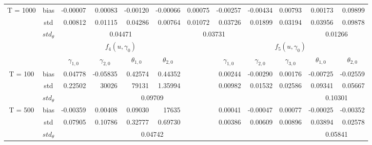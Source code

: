 \documentclass[a4paper,12pt,times,numbered,print,index]{report}
\numberwithin{equation}{section}
\begin{document}
\begin{table}[htbp]
\begin{adjustbox}{max width=1.1\textwidth}
\begin{tabular}{cc|rrccrrrrcc}
				\multirow{3}[1]{*}{T = 1000} & bias  & -0.00007 & 0.00083 & \multicolumn{1}{r|}{-0.00120} & \multicolumn{1}{r}{-0.00066} & 0.00075 & \multicolumn{1}{r|}{-0.00257} & -0.00434 & 0.00793 & \multicolumn{1}{r}{0.00173} & \multicolumn{1}{r}{0.09899} \\
				& std   & 0.00812 & 0.01115 & \multicolumn{1}{r|}{0.04286} & \multicolumn{1}{r}{0.00764} & 0.01072 & \multicolumn{1}{r|}{0.03726} & 0.01899 & 0.03194 & \multicolumn{1}{r}{0.03956} & \multicolumn{1}{r}{0.09878} \\
				& $std_{\theta}$ &       & \multicolumn{2}{c|}{0.04471} &       & \multicolumn{2}{c|}{0.03731} &       &       & \multicolumn{2}{c}{0.01266} \\
				\midrule
				&       & \multicolumn{4}{c}{$f_4(u,\gamma_{0})$}        &       & \multicolumn{5}{c}{$f_5(u,\gamma_{0})$} \\
				&       & \multicolumn{1}{c}{$\gamma_{1,0}$} & \multicolumn{1}{c}{$\gamma_{2,0}$} & $\theta_{1,0}$ & $\theta_{2,0}$ &       & \multicolumn{1}{c}{$\gamma_{1,0}$} & \multicolumn{1}{c}{$\gamma_{2,0}$} & \multicolumn{1}{c}{$\gamma_{3,0}$} & $\theta_{1,0}$ & $\theta_{2,0}$ \\
				\midrule
				\multirow{3}[1]{*}{T = 100} & bias  & 0.04778 & -0.05835 & \multicolumn{1}{r}{0.42574} & \multicolumn{1}{r}{0.44352} &       & 0.00244 & -0.00290 & 0.00176 & \multicolumn{1}{r}{-0.00725} & \multicolumn{1}{r}{-0.02559} \\
				& std   & 0.22502 & 30026 & \multicolumn{1}{r}{79131} & \multicolumn{1}{r}{1.35994} &       & 0.00982 & 0.01532 & 0.02586 & \multicolumn{1}{r}{0.09341} & \multicolumn{1}{r}{0.05667} \\
				& $std_{\theta}$ &       &       & \multicolumn{2}{c}{0.09709} &       &       &       &       & \multicolumn{2}{c}{0.10301} \\
				
				\multirow{3}[0]{*}{T = 500} & bias  & -0.00359 & 0.00408 & \multicolumn{1}{r}{0.09030} & \multicolumn{1}{r}{17635} &       & 0.00041 & -0.00047 & 0.00077 & \multicolumn{1}{r}{-0.00025} & \multicolumn{1}{r}{-0.00352} \\
				& std   & 0.07905 & 0.10786 & \multicolumn{1}{r}{0.32777} & \multicolumn{1}{r}{0.69730} &       & 0.00386 & 0.00609 & 0.00896 & \multicolumn{1}{r}{0.03894} & \multicolumn{1}{r}{0.02578} \\
				& $std_{\theta}$ &       &       & \multicolumn{2}{c}{0.04742} &       &       &       &       & \multicolumn{2}{c}{0.05841} \\
				

\end{tabular}
\end{adjustbox}
\end{table}
\end{document}
